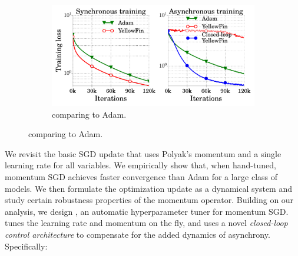 \begin{figure}
\vspace{-1.0em}
\begin{minipage}{1.0\linewidth}
\begin{figure}[H]
	\includegraphics[width=1.0\linewidth]{experiment_results/spotlight.pdf}
	\caption{\tuner comparing to Adam.}
\end{figure}
\end{minipage}
\end{figure}
We revisit the basic SGD update that uses Polyak's momentum and a single learning rate for all variables.
We empirically show that, when hand-tuned, momentum SGD achieves faster convergence than Adam for a large class of models.
We then formulate the optimization update as a dynamical system and study certain robustness properties of the momentum operator.
Building on our analysis, we design \tuner, an automatic hyperparameter tuner for momentum SGD.
\tuner tunes the learning rate and momentum on the fly, and uses a novel {\em closed-loop control architecture} to compensate for the added dynamics of asynchrony.
Specifically:
